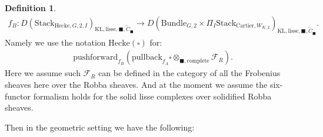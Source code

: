 \documentclass[12pt]{book}
\theoremstyle{definition}
\newtheorem{definition}{Definition}
\begin{document}
\begin{definition}
\begin{align}
f_B: D(\mathrm{Stack}_{\mathrm{Hecke},G,2,I})_{\text{KL},\mathrm{lisse},\blacksquare,\widetilde{C}_\blacksquare} \rightarrow D(\mathrm{Bundle}_{G,2}\times \Pi_I \mathrm{Stack}_{\mathrm{Cartier},W_{K,2}})_{\text{KL},\mathrm{lisse},\blacksquare,\widetilde{C}_\blacksquare}.
\end{align}
Namely we use the notation $\mathrm{Hecke}(\square)$ for:
\begin{align}
\mathrm{pushforward}_{f_B}(\mathrm{pullback}_{f_A}\square\otimes_{\blacksquare,\mathrm{complete}}\mathcal{F}_R).
\end{align}
Here we assume such $\mathcal{F}_R$ can be defined in the category of all the Frobenius sheaves here over the Robba sheaves. And at the moment we assume the six-functor formalism holds for the solid lisse complexes over solidified Robba sheaves.
\end{definition}

Then in the geometric setting we have the following:
\end{document}
